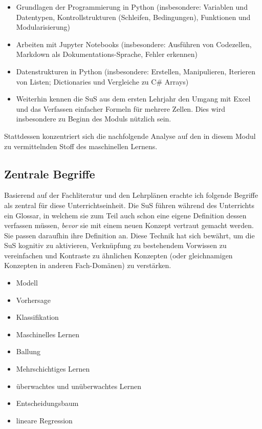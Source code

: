 \documentclass[twocolumn]{article}
\begin{document}
\begin{itemize}
\item Grundlagen der Programmierung in Python (insbesondere: Variablen und Datentypen, Kontrollstrukturen (Schleifen, Bedingungen), Funktionen und Modularisierung)

\item Arbeiten mit Jupyter Notebooks (insbesondere: Ausführen von Codezellen, Markdown als Dokumentations-Sprache, Fehler erkennen)

\item Datenstrukturen in Python (insbesondere: Erstellen, Manipulieren, Iterieren von Listen; Dictionaries und Vergleiche zu C\# Arrays)

\item Weiterhin kennen die SuS aus dem ersten Lehrjahr den Umgang mit Excel und das Verfassen einfacher Formeln für mehrere Zellen. Dies wird insbesondere zu Beginn des Moduls nützlich sein.

\end{itemize}

Stattdessen konzentriert sich die nachfolgende Analyse auf den in diesem Modul zu vermittelnden Stoff des maschinellen Lernens.

\subsection{Zentrale Begriffe}

Basierend auf der Fachliteratur und den Lehrplänen erachte ich folgende Begriffe als zentral für diese Unterrichtseinheit. Die SuS führen während des Unterrichts ein Glossar, in welchem sie zum Teil auch schon eine eigene Definition dessen verfassen müssen, \textit{bevor} sie mit einem neuen Konzept vertraut gemacht werden. Sie passen daraufhin ihre Definition an. Diese Technik hat sich bewährt, um die SuS kognitiv zu aktivieren, Verknüpfung zu bestehendem Vorwissen zu vereinfachen und Kontraste zu ähnlichen Konzepten (oder gleichnamigen Konzepten in anderen Fach-Domänen) zu verstärken.

\begin{itemize}[noitemsep]
    \item Modell
    \item Vorhersage
    \item Klassifikation
    \item Maschinelles Lernen
    \item Ballung
    \item Mehrschichtiges Lernen
    \item überwachtes und unüberwachtes Lernen
    \item Entscheidungsbaum
    \item lineare Regression
\end{itemize}
\end{document}
